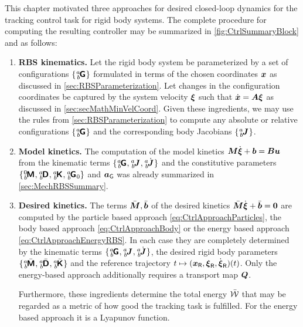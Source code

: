 This chapter motivated three approaches for desired closed-loop dynamics for the tracking control task for rigid body systems.
The complete procedure for computing the resulting controller may be summarized in \autoref{fig:CtrlSummaryBlock} and as follows:
\begin{enumerate}
\item \textbf{RBS kinematics.}
Let the rigid body system be parameterized by a set of configurations $\{\bodyHomoCoord{\BidxI}{\BidxII}\}$ formulated in terms of the chosen coordinates $\boldsymbol{x}$ as discussed in \autoref{sec:RBSParameterization}.
Let changes in the configuration coordinates be captured by the system velocity $\boldsymbol{\xi}$ such that $\dot{\boldsymbol{x}} = \boldsymbol{A} \boldsymbol{\xi}$ as discussed in \autoref{sec:secMathMinVelCoord}.
Given these ingredients, we may use the rules from \autoref{sec:RBSParameterization} to compute any absolute or relative configurations $\{\bodyHomoCoord{\BidxI}{\BidxII}\}$ and the corresponding body Jacobians $\{\bodyJac{\BidxI}{\BidxII}\}$.

\item \textbf{Model kinetics.}
The computation of the model kinetics $\boldsymbol{M} \dot{\boldsymbol{\xi}} + \boldsymbol{b} = \boldsymbol{B} \boldsymbol{u}$ from the kinematic terms $\{\bodyHomoCoord{\BidxI}{\BidxII}, \bodyJac{\BidxI}{\BidxII}, \bodyJacd{\BidxI}{\BidxII}\}$ and the constitutive parameters $\{\bodyInertiaMat{0}{\BidxII}, \bodyDissMat{\BidxI}{\BidxII}, \bodyStiffMat{\BidxI}{\BidxII}, \bodyHomoCoord{\BidxI}{\BidxII}_0\}$ and $\boldsymbol{a}_{\mathsf{G}}$ was already summarized in \autoref{sec:MechRBSSummary}.

\item \textbf{Desired kinetics.}
The terms $\bar{\boldsymbol{M}}, \bar{\boldsymbol{b}}$ of the desired kinetics $\bar{\boldsymbol{M}}\dot{\boldsymbol{\xi}} + \bar{\boldsymbol{b}}=\boldsymbol{0}$ are computed by the particle based approach \eqref{eq:CtrlApproachParticles}, the body based approach \eqref{eq:CtrlApproachBody} or the energy based approach \eqref{eq:CtrlApproachEnergyRBS}.
In each case they are completely determined by the kinematic terms $\{\bodyHomoCoord{\BidxI}{\BidxII}, \bodyJac{\BidxI}{\BidxII}, \bodyJacd{\BidxI}{\BidxII}\}$, the desired rigid body parameters $\{\bodyInertiaMatC{\BidxI}{\BidxII}, \bodyDissMatC{\BidxI}{\BidxII}, \bodyStiffMatC{\BidxI}{\BidxII}\}$ and the reference trajectory $t\mapsto(\boldsymbol{x}_{\mathsf{R}}, \boldsymbol{\xi}_{\mathsf{R}}, \dot{\boldsymbol{\xi}}_{\mathsf{R}})(t)$.
Only the energy-based approach additionally requires a transport map $\boldsymbol{Q}$.

Furthermore, these ingredients determine the total energy $\bar{\mathcal{W}}$ that may be regarded as a metric of how good the tracking task is fulfilled.
For the energy based approach it is a Lyapunov function.


\end{enumerate}
